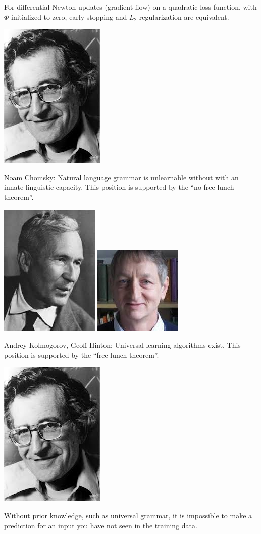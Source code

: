 {{\vfill
For differential Newton updates (gradient flow) on a quadratic loss function, with $\Phi$ initialized to zero, early stopping and $L_2$ regularization are equivalent.
}


\includegraphics[width=1.0 in]{../images/Chomsky} \begin{minipage}[b]{8in} Noam Chomsky: 
Natural language grammar is unlearnable without with an innate linguistic capacity. This position is supported by the ``no free lunch theorem''.\end{minipage}

\vfill
\includegraphics[height=1.0 in]{../images/Kolmogorov}
\includegraphics[height=1.0 in]{../images/Hinton}
\begin{minipage}[b]{7in}
Andrey Kolmogorov, Geoff Hinton: Universal learning algorithms exist. This position is supported by the ``free lunch theorem''.
\end{minipage}


\includegraphics[width=1.0 in]{../images/Chomsky} 

Without prior knowledge, such as universal grammar, it is impossible to make a prediction for an input you have not seen in the training data.


}
